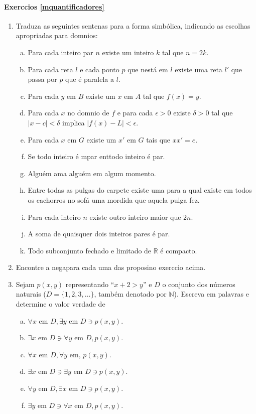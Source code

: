 \paragraph{Exerc\ih cios \ref{mquantificadores}}

\begin{enumerate}[{\bf 1.}]
\item Traduza as seguintes senten\cc as para a forma simb\'olica, indicando as escolhas apropriadas para dom\ih nios:
\begin{enumerate}[a)]
\item Para cada inteiro par $n$ existe um inteiro $k$ tal que $n=2k$.
\item Para cada reta $l$ e cada ponto $p$ que n\ao est\'a em $l$ existe uma reta $l'$ que passa por $p$ que \'e paralela a $l$.
\item Para cada $y$ em $B$ existe um $x$ em $A$ tal que $f(x)=y$.
\item Para cada $x$ no dom\ih nio de $f$ e para cada $\epsilon >0$ existe $\delta >0$ tal que $|x-c|<\delta$ implica $|f(x)-L|<\epsilon$.
\item Para cada $x$ em $G$ existe um $x'$ em $G$ tais que $xx'=e$.
\item Se todo inteiro \'e \ih mpar ent\ao todo inteiro \'e par.
\item Algu\'em ama algu\'em em algum momento.
\item Entre todas as pulgas do carpete existe uma para a qual existe em todos os cachorros no sof\'a uma mordida que aquela pulga fez.
\item Para cada inteiro $n$ existe outro inteiro maior que $2n$.
\item A soma de quaisquer dois inteiros pares \'e par.
\item Todo subconjunto fechado e limitado de $\mathbb{R}$ \'e compacto.
\end{enumerate}

\item Encontre a nega\cao para cada uma das proposi\coes no exerc\ih cio acima.

\item Sejam $p(x,y)$ representando ``$x+2>y$'' e $D$ o conjunto dos n\'umeros naturais ($D=\{1,2,3,\ldots\}$, tamb\'em denotado por $\mathbb{N}$). Escreva em palavras e determine o valor verdade de
\begin{enumerate}[a)]
\item $\forall x \textrm{ em } D, \exists y \textrm{ em } D \ni p(x,y)$.
\item $\exists x \textrm{ em } D \ni \forall y \textrm{ em } D, p(x,y)$.
\item $\forall x \textrm{ em } D, \forall y \textrm{ em, } p(x,y)$.
\item $\exists x \textrm{ em } D \ni \exists y \textrm{ em } D \ni p(x,y)$.
\item $\forall y \textrm{ em } D, \exists x \textrm{ em } D \ni p(x,y)$.
\item $\exists y \textrm{ em } D \ni \forall x \textrm{ em } D, p(x,y)$.
\end{enumerate} 


\end{enumerate}
